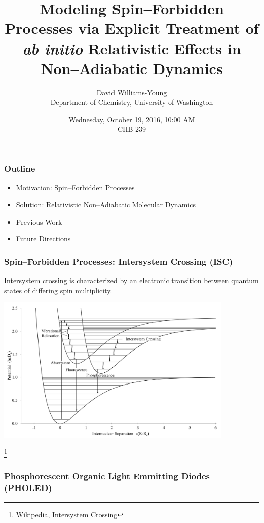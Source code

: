 \documentclass[usepdftitle=false,10pt]{beamer}
\title{Modeling Spin--Forbidden Processes via Explicit Treatment of \emph{ab initio} Relativistic Effects in Non--Adiabatic Dynamics}
\date{Wednesday, October 19, 2016, 10:00 AM \\ CHB 239}
\author{David Williams-Young\\ Department of Chemistry, University of Washington\\
}
\newcommand\blfootnote[1]{%
  \begingroup
  \renewcommand\thefootnote{}\footnote{#1}%
  \addtocounter{footnote}{-1}%
  \endgroup
}
\begin{document}
\begin{frame}
  \titlepage
\end{frame}

\begin{frame}
  \frametitle{Outline}
  \begin{itemize}
    \item[\ding{228}] Motivation: Spin--Forbidden Processes
    \item[\ding{228}] Solution: Relativistic Non--Adiabatic Molecular Dynamics
    \item[\ding{228}] Previous Work
    \item[\ding{228}] Future Directions
  \end{itemize}
\end{frame}

\begin{frame}
  \frametitle{Spin--Forbidden Processes: Intersystem Crossing (ISC)}

  \noindent
  Intersystem crossing is characterized by an electronic transition between
  quantum states of differing spin multiplicity.

  \begin{center}
  \includegraphics[width=0.85\textwidth]{ISC} 
  \end{center}
  \vspace{-1cm}
  \blfootnote{\tiny Wikipedia, Intersystem Crossing}
\end{frame}

\begin{frame}
  \frametitle{{\bf Ph}osphorescent {\bf O}rganic {\bf L}ight {\bf E}mmitting
  {\bf D}iodes (PHOLED)}
\end{frame}
\end{document}
